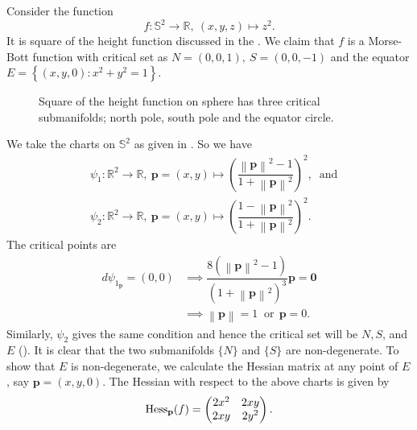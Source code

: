 \begin{eg}\label{eg:MorseBottSphereHeightSquared}
    Consider the function 
    \begin{displaymath}
        f:\mathbb{S}^2\to \mathbb{R},~(x,y,z)\mapsto z^2.
    \end{displaymath}
    It is square of the height function discussed in the . We claim that $f$ is a Morse-Bott function with critical set as $N=(0,0,1),~S=(0,0,-1)$ and the equator $E=\left\{(x,y,0):x^2+y^2=1\right\}$.  
    \begin{figure}[H]
        \centering
        \caption{Square of the height function on sphere has three critical submanifolds; north pole, south pole and the equator circle.\label{fig:MorseBottSphereHeightSquared}}
    \end{figure}
    \noindent We take the charts on $\mathbb{S}^2$ as given in . So we have
    \begin{align*}
        & \psi_1:\mathbb{R}^2\to \mathbb{R},~\mathbf{p}=(x,y)\mapsto \left(\dfrac{\left\|\mathbf{p}\right\|^2-1}{1+\left\|\mathbf{p}\right\|^2} \right)^2,~\text{ and} \\[1ex]
        & \psi_2:\mathbb{R}^2\to \mathbb{R},~\mathbf{p}=(x,y)\mapsto \left(\dfrac{1-\left\|\mathbf{p}\right\|^2}{1+\left\|\mathbf{p}\right\|^2} \right)^2.
    \end{align*} 
    The critical points are 
    \begin{align*}
        d\psi_{1_{\mathbf{p}}} = (0,0) & \implies \dfrac{8 \left(\left\|\mathbf{p}\right\|^2-1\right)}{\left(1+\left\|\mathbf{p}\right\|^2\right)^3}\mathbf{p} = \mathbf{0} \\[1ex]
        & \implies \left\|\mathbf{p}\right\| = 1 ~\text{ or}~~ \mathbf{p} = 0.
    \end{align*}
    Similarly, $\psi_2$ gives the same condition and hence the critical set will be $N,S$, and $E$ (). It is clear that the two submanifolds $\{N\}$ and $\{S\}$ are non-degenerate. To show that $E$ is non-degenerate, we calculate the Hessian matrix at any point of $E$, say $\mathbf{p}=(x,y,0)$. The Hessian with respect to the above charts is given by
    \begin{displaymath}
        \hess_\mathbf{p}(f) = 
        \begin{pmatrix}
            2x^2 & 2xy \\
            2xy & 2y^2
        \end{pmatrix}.

\end{displaymath}
\end{eg}
